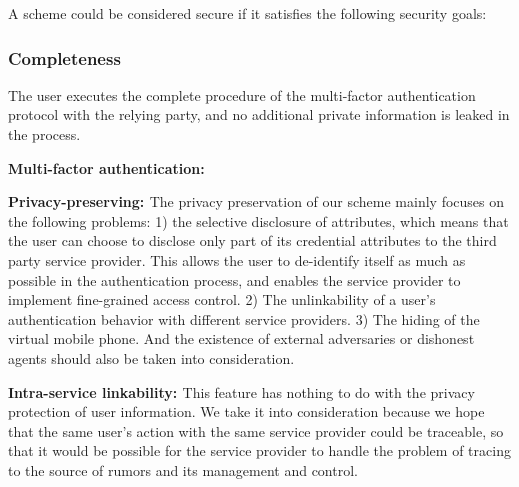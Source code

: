 A scheme could be considered secure if it satisfies the following security goals:
\subsubsection{Completeness}
The user executes the complete procedure of the multi-factor authentication protocol with the relying party, and no additional private information is leaked in the process.
\begin{list}{}{}
    \item{\bf{Multi-factor authentication: }}
    \item{\bf{Privacy-preserving: }}The privacy preservation of our scheme mainly focuses on the following problems: 1) the selective disclosure of attributes, which means that the user can choose to disclose only part of its credential attributes to the third party service provider. This allows the user to de-identify itself as much as possible in the authentication process, and enables the service provider to implement fine-grained access control. 2) The unlinkability of a user's authentication behavior with different service providers. 3) The hiding of the virtual mobile phone. And the existence of external adversaries or dishonest agents should also be taken into consideration.\\
    \item{\bf{Intra-service linkability: }}This feature has nothing to do with the privacy protection of user information. We take it into consideration because we hope that the same user's action with the same service provider could be traceable, so that it would be possible for the service provider to handle the problem of tracing to the source of rumors and its management and control.\\
\end{list}

